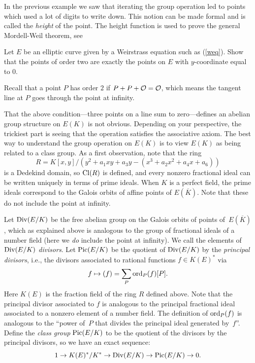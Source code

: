 \begin{remark}
In the previous example we saw that iterating the
group operation led to points which used a lot of digits
to write down. This notion can be made formal and is called
the \emph{height} of the point. The height function is used
to prove the general Mordell-Weil theorem, see
\cite[Ch. VIII.4]{silverman:aec}
\end{remark}

\begin{exercise}\label{ex:ec2torsion}
	Let $E$ be an elliptic curve given by a
	Weirstrass equation such as (\ref{weq}).
	Show that the points of order two are exactly
	the points on $E$ with $y$-coordinate equal to
	$0$.

	\begin{hint}
		Recall that a point $P$ has order $2$ if
		$P + P + \mathcal{O} = \mathcal{O}$, which means the tangent line
		at $P$ goes through the point at infinity.
	\end{hint}
\end{exercise}

That the above condition---three points on a line sum to
zero---defines an abelian group structure on $E(K)$ is not obvious.
Depending on your perspective, the trickiest part is seeing that the
operation satisfies the associative axiom.  The best way to understand
the group operation on $E(K)$ is to view $E(K)$ as being related to a
class group.  As a first observation, note that the ring
$$
 R = K[x,y]/(y^2 +a_1 xy + a_3 y - (x^3 + a_2 x^2 + a_4 x + a_6))
$$
is a Dedekind domain, so $\operatorname{Cl}(R)$ is defined, and every nonzero
fractional ideal can be written uniquely in terms of prime ideals.
When $K$ is a perfect field, the prime ideals correspond to the Galois
orbits of affine points of $E(\overline{K})$.
Note that these do not include the point at infinity.

Let $\operatorname{Div}(E/K)$ be the free abelian group on the Galois orbits of
points of~$E(\overline{K})$, which as explained above is analogous to
the group of fractional ideals of a number field (here we {\em do}
include the point at infinity).
We call the elements of $\operatorname{Div}(E/K)$
{\em divisors}.  Let $\operatorname{Pic}(E/K)$ be the quotient of $\operatorname{Div}(E/K)$ by the
\emph{principal divisors}, i.e., the divisors associated to rational functions
$f\in K(E)^*$ via
$$
 f \mapsto (f) = \sum_{P} \operatorname{ord}_P(f) [P].
$$
Here $K(E)$ is the fraction field of the ring $R$ defined above.
Note that the principal divisor associated to $f$ is analogous to the
principal fractional ideal associated to a nonzero element of a number
field.  The definition of $\operatorname{ord}_P(f)$ is analogous to the ``power
of~$P$ that divides the principal ideal generated by~$f$''.
Define the \emph{class group} $\operatorname{Pic}(E/K)$ to be the quotient of the
divisors by the principal divisors, so we have
an exact sequence:
$$
  1\to K(E)^*/K^* \to \operatorname{Div}(E/K) \to \operatorname{Pic}(E/K) \to 0.
$$


